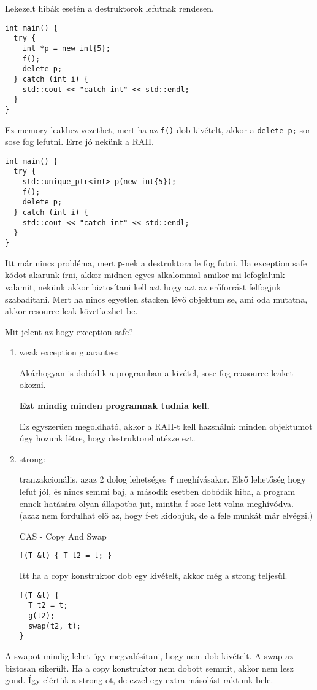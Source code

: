 \documentclass[a4paper,11.5pt]{article}
\begin{document}
		Lekezelt hibák esetén a destruktorok lefutnak rendesen.
		\begin{lstlisting}
int main() {
  try {
    int *p = new int{5};
    f();
    delete p;
  } catch (int i) {
    std::cout << "catch int" << std::endl;
  }
}
		\end{lstlisting}
		
		Ez memory leakhez vezethet, mert ha az \texttt{f()} dob kivételt, akkor a \texttt{delete p;} sor sose fog lefutni. Erre jó nekünk a RAII. 
		
		\begin{lstlisting}
int main() {
  try {
    std::unique_ptr<int> p(new int{5});
    f();
    delete p;
  } catch (int i) {
    std::cout << "catch int" << std::endl;
  }
}
		\end{lstlisting}
		
		Itt már nincs probléma, mert \texttt{p}-nek a destruktora le fog futni. Ha exception safe kódot akarunk írni, akkor midnen egyes alkalommal amikor mi lefoglalunk valamit, nekünk akkor biztosítani kell azt hogy azt az erőforrást felfogjuk szabadítani. Mert ha nincs egyetlen stacken lévő objektum se, ami oda mutatna, akkor resource leak következhet be.
		
		Mit jelent az hogy exception safe?
		
		\begin{enumerate}
			\item weak exception guarantee:
			
			Akárhogyan is dobódik a programban a kivétel, sose fog reasource leaket okozni.
			
			\textbf{Ezt mindig minden programnak tudnia kell.}
			
			Ez egyszerűen megoldható, akkor a RAII-t kell hazsnálni: minden objektumot úgy hozunk létre, hogy  destruktorelintézze ezt.
			
			\item strong:
			
			tranzakcionális, azaz 2 dolog lehetséges \texttt{f} meghívásakor. Első lehetőség hogy lefut jól, és nincs semmi baj, a második esetben dobódik hiba, a program ennek hatására olyan állapotba jut, mintha f sose lett volna meghívódva. (azaz nem fordulhat elő az, hogy f-et kidobjuk, de a fele munkát már elvégzi.)
			
			CAS - Copy And Swap
			\begin{lstlisting}
f(T &t) { T t2 = t; }
			\end{lstlisting}
			
			Itt ha a copy konstruktor dob egy kivételt, akkor még a strong teljesül.
			
			\begin{lstlisting}
f(T &t) {
  T t2 = t;
  g(t2);
  swap(t2, t);
}
			\end{lstlisting}
			
		\end{enumerate}
			A swapot mindig lehet úgy megvalósítani, hogy nem dob kivételt. A swap az biztosan sikerült. Ha a copy konstruktor nem dobott semmit, akkor nem lesz gond. Így elértük a strong-ot, de ezzel egy extra másolást raktunk bele.
			
\end{document}
